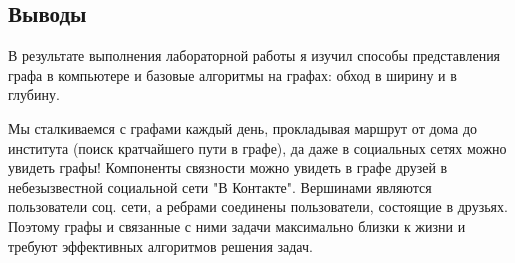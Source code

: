 \documentclass[12pt]{article}
\begin{document}
	\subsection*{Выводы}
	
	
	В результате выполнения лабораторной работы я изучил способы представления графа в компьютере и базовые алгоритмы на графах: обход в ширину и в глубину.
	
	Мы сталкиваемся с графами каждый день, прокладывая маршрут от дома до института (поиск кратчайшего пути в графе), да даже в социальных сетях можно увидеть графы! Компоненты связности можно увидеть в графе друзей в небезызвестной социальной сети "В Контакте". Вершинами являются пользователи соц. сети, а ребрами соединены пользователи, состоящие в друзьях. Поэтому графы и связанные с ними задачи максимально близки к жизни и требуют эффективных алгоритмов решения задач.
\end{document}
